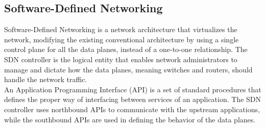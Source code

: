 \documentclass[conference]{IEEEtran}
\begin{document}
\subsection{Software-Defined Networking}
Software-Defined Networking is a network architecture that virtualizes the network, modifying the existing conventional architecture by using a single control plane for all the data planes, instead of a one-to-one relationship. The SDN controller is the logical entity that enables network administrators to manage and dictate how the data planes, meaning switches and routers, should handle the network traffic\cite{CiscoCCNA3}.
\\
An Application Programming Interface (API) is a set of standard procedures that defines the proper way of interfacing between services of an application. The SDN controller uses northbound APIs to communicate with the upstream applications, while the southbound APIs are used in defining the behavior of the data planes.
\\
\end{document}
